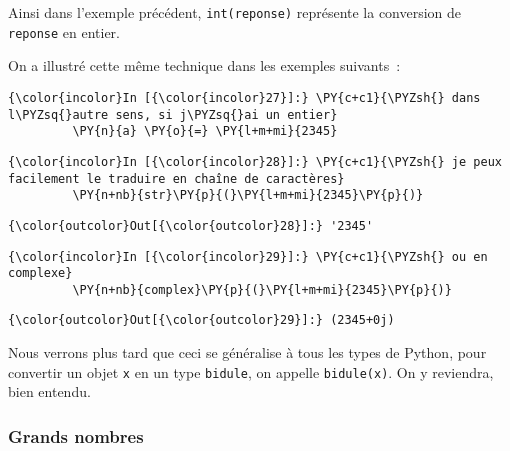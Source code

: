 Ainsi dans l'exemple précédent, \texttt{int(reponse)} représente la
conversion de \texttt{reponse} en entier.

On a illustré cette même technique dans les exemples suivants~:

    \begin{Verbatim}[commandchars=\\\{\},frame=single,framerule=0.3mm,rulecolor=\color{cellframecolor}]
{\color{incolor}In [{\color{incolor}27}]:} \PY{c+c1}{\PYZsh{} dans l\PYZsq{}autre sens, si j\PYZsq{}ai un entier}
         \PY{n}{a} \PY{o}{=} \PY{l+m+mi}{2345}
\end{Verbatim}


    \begin{Verbatim}[commandchars=\\\{\},frame=single,framerule=0.3mm,rulecolor=\color{cellframecolor}]
{\color{incolor}In [{\color{incolor}28}]:} \PY{c+c1}{\PYZsh{} je peux facilement le traduire en chaîne de caractères}
         \PY{n+nb}{str}\PY{p}{(}\PY{l+m+mi}{2345}\PY{p}{)}
\end{Verbatim}


\begin{Verbatim}[commandchars=\\\{\},frame=single,framerule=0.3mm,rulecolor=\color{cellframecolor}]
{\color{outcolor}Out[{\color{outcolor}28}]:} '2345'
\end{Verbatim}
            
    \begin{Verbatim}[commandchars=\\\{\},frame=single,framerule=0.3mm,rulecolor=\color{cellframecolor}]
{\color{incolor}In [{\color{incolor}29}]:} \PY{c+c1}{\PYZsh{} ou en complexe}
         \PY{n+nb}{complex}\PY{p}{(}\PY{l+m+mi}{2345}\PY{p}{)}
\end{Verbatim}


\begin{Verbatim}[commandchars=\\\{\},frame=single,framerule=0.3mm,rulecolor=\color{cellframecolor}]
{\color{outcolor}Out[{\color{outcolor}29}]:} (2345+0j)
\end{Verbatim}
            
    Nous verrons plus tard que ceci se généralise à tous les types de
Python, pour convertir un objet \texttt{x} en un type \texttt{bidule},
on appelle \texttt{bidule(x)}. On y reviendra, bien entendu.

    \hypertarget{grands-nombres}{%
\subsubsection{Grands nombres}\label{grands-nombres}}

